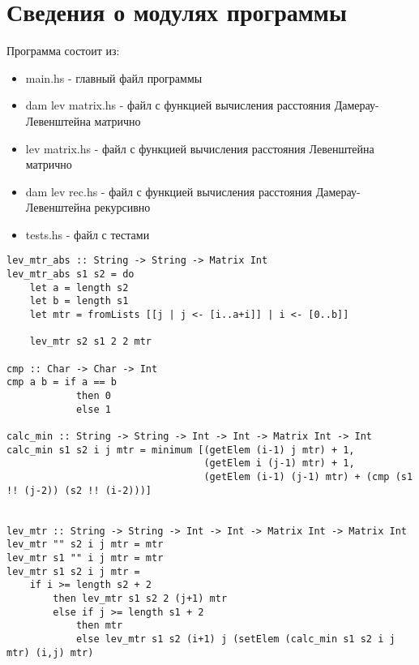 \documentclass[12pt]{report}
\begin{document}
\section{Сведения о модулях программы}
Программа состоит из:
\begin{itemize}
	\item main.hs - главный файл программы
	\item dam lev matrix.hs - файл с функцией вычисления расстояния Дамерау-Левенштейна матрично
	\item lev matrix.hs - файл с функцией вычисления расстояния Левенштейна матрично
	\item dam lev rec.hs - файл с функцией вычисления расстояния Дамерау-Левенштейна рекурсивно
	\item tests.hs - файл с тестами 
\end{itemize}

\begin{lstlisting}[label=some-code,caption=Функция нахождения расстояния Левенштейна матрично]
lev_mtr_abs :: String -> String -> Matrix Int
lev_mtr_abs s1 s2 = do
    let a = length s2
    let b = length s1
    let mtr = fromLists [[j | j <- [i..a+i]] | i <- [0..b]]
    
    lev_mtr s2 s1 2 2 mtr

cmp :: Char -> Char -> Int
cmp a b = if a == b
            then 0
            else 1

calc_min :: String -> String -> Int -> Int -> Matrix Int -> Int
calc_min s1 s2 i j mtr = minimum [(getElem (i-1) j mtr) + 1, 
                                  (getElem i (j-1) mtr) + 1,
                                  (getElem (i-1) (j-1) mtr) + (cmp (s1 !! (j-2)) (s2 !! (i-2)))]

                                
lev_mtr :: String -> String -> Int -> Int -> Matrix Int -> Matrix Int
lev_mtr "" s2 i j mtr = mtr
lev_mtr s1 "" i j mtr = mtr
lev_mtr s1 s2 i j mtr = 
    if i >= length s2 + 2
        then lev_mtr s1 s2 2 (j+1) mtr
        else if j >= length s1 + 2
            then mtr
            else lev_mtr s1 s2 (i+1) j (setElem (calc_min s1 s2 i j mtr) (i,j) mtr)
\end{lstlisting}
\end{document}
